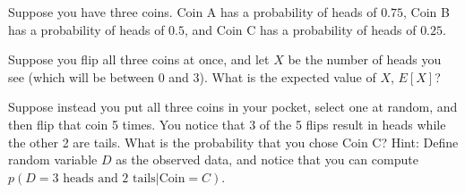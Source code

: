 
 Suppose you have three coins. Coin A has a probability of
  heads of $0.75$, Coin B has a probability of heads of $0.5$, 
  and Coin C has a probability of heads of $0.25$.

   Suppose you flip all three coins at once, and let $X$ be the number of
  heads you see (which will be between 0 and 3).
  What is the expected value of $X$, $E[X]$?
  
 Suppose instead you put all three coins in your
  pocket, select one at random, and then flip that coin 5 times. You
  notice that 3 of the 5 flips result in heads while the other 2 are
  tails. What is the probability that you chose Coin C? Hint: Define random variable $D$ as the observed data, and notice that you can compute $p(D = \text{3 heads and 2 tails} | \text{Coin} = C)$. 
